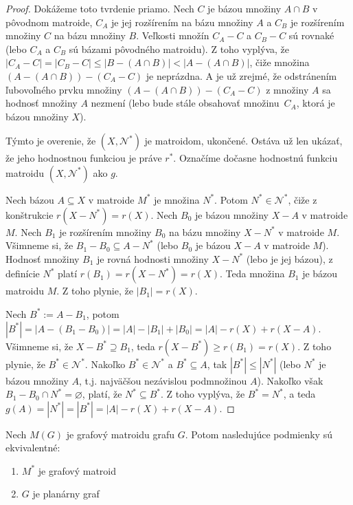 \begin{proof}
Dokážeme toto tvrdenie priamo.
Nech $C$ je bázou množiny $A \cap B$ v pôvodnom matroide, $C_A$ je jej rozšírením na bázu množiny $A$ a $C_B$ je rozšírením množiny $C$ na bázu množiny $B$.
Veľkosti množín $C_A - C$ a $C_B - C$ sú rovnaké (lebo $C_A$ a $C_B$ sú bázami pôvodného matroidu).
Z toho vyplýva, že $|C_A - C| = |C_B - C| \leq |B - (A \cap B)| < |A - (A \cap B)|$, čiže množina $(A-(A \cap B))-(C_A-C)$ je neprázdna.
A je už zrejmé, že odstránením ľubovoľného prvku množiny $(A-(A \cap B))-(C_A-C)$ z množiny $A$ sa hodnosť množiny $A$ nezmení (lebo bude stále obsahovať množinu~$C_A$, ktorá je bázou množiny $X$).

Týmto je overenie, že $(X, \mathcal{N}^*)$ je matroidom, ukončené.
Ostáva už len ukázať, že jeho hodnostnou funkciou je práve $r^*$.
Označíme dočasne hodnostnú funkciu matroidu $(X, \mathcal{N}^*)$ ako $g$.

Nech bázou $A \subseteq X$ v matroide $M^*$ je množina $N^*$.
Potom $N^* \in \mathcal{N}^*$, čiže z konštrukcie $r(X - N^*) = r(X)$.
Nech $B_0$ je bázou množiny $X-A$ v matroide $M$.
Nech $B_1$ je rozšírením množiny $B_0$ na bázu množiny $X-N^*$ v matroide $M$.
Všimneme si, že $B_1 - B_0 \subseteq A-N^*$ (lebo $B_0$ je bázou $X - A$ v matroide $M$).
Hodnosť množiny $B_1$ je rovná hodnosti množiny $X - N^*$ (lebo je jej bázou), z definície $N^*$ platí $r(B_1) = r(X - N^*) = r(X)$.
Teda množina $B_1$ je bázou matroidu $M$.
Z toho plynie, že $|B_1| = r(X)$.

Nech $B^* := A - B_1$, potom $|B^*| = |A - (B_1-B_0)| = |A| - |B_1| + |B_0| = |A| - r(X) + r(X - A)$. 
Všimneme si, že $X - B^* \supseteq B_1$, teda $r(X - B^*) \geq r(B_1) = r(X)$.
Z toho plynie, že $B^* \in \mathcal{N}^*$.
Nakoľko $B^* \in \mathcal{N}^*$ a $B^* \subseteq A$, tak $|B^*| \leq |N^*|$ (lebo $N^*$ je bázou množiny $A$, t.j. najväčšou nezávislou podmnožinou $A$).
Nakoľko však $B_1 - B_0 \cap N^* = \varnothing$, platí, že $N^* \subseteq B^*$.
Z toho vyplýva, že $B^* = N^*$, a teda $g(A) = |N^*| = |B^*| = |A| - r(X) + r(X - A)$.
\end{proof}


\begin{theorem_hard}
Nech $M(G)$ je grafový matroidu grafu $G$. Potom nasledujúce podmienky sú ekvivalentné:
\begin{enumerate}
    \item $M^*$ je grafový matroid
    \item $G$ je planárny graf
\end{enumerate}
\end{theorem_hard}

